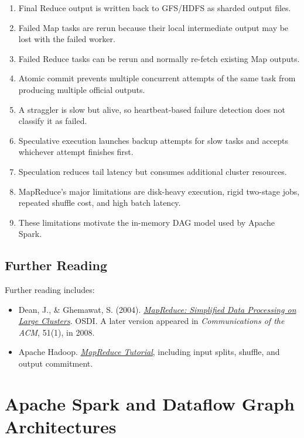 \documentclass[11pt,a4paper,oneside]{book}
\begin{document}
\begin{enumerate}
    \item Final Reduce output is written back to GFS/HDFS as sharded output files.
    \item Failed Map tasks are rerun because their local intermediate output may be lost with the failed worker.
    \item Failed Reduce tasks can be rerun and normally re-fetch existing Map outputs.
    \item Atomic commit prevents multiple concurrent attempts of the same task from producing multiple official outputs.
    \item A straggler is slow but alive, so heartbeat-based failure detection does not classify it as failed.
    \item Speculative execution launches backup attempts for slow tasks and accepts whichever attempt finishes first.
    \item Speculation reduces tail latency but consumes additional cluster resources.
    \item MapReduce's major limitations are disk-heavy execution, rigid two-stage jobs, repeated shuffle cost, and high batch latency.
    \item These limitations motivate the in-memory DAG model used by Apache Spark.
\end{enumerate}

\section{Further Reading}

Further reading includes:

\begin{itemize}
    \item Dean, J., \& Ghemawat, S. (2004). \href{https://research.google.com/archive/mapreduce-osdi04.pdf}{\emph{MapReduce: Simplified Data Processing on Large Clusters}}. OSDI. A later version appeared in \emph{Communications of the ACM}, 51(1), in 2008.
    \item Apache Hadoop. \href{https://hadoop.apache.org/docs/r3.3.3/hadoop-mapreduce-client/hadoop-mapreduce-client-core/MapReduceTutorial.html}{\emph{MapReduce Tutorial}}, including input splits, shuffle, and output commitment.
\end{itemize}


\chapter[Apache Spark and Dataflow Graph Architectures]{Apache Spark and Dataflow Graph\\Architectures}
\label{chap:spark-dag}
\end{document}

